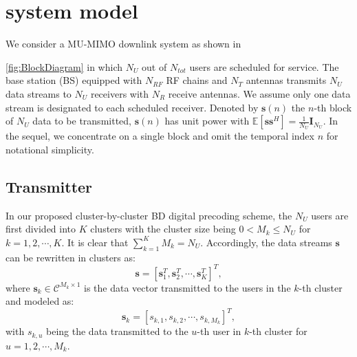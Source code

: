 \documentclass[conference]{IEEEtran}
\begin{document}
\section{system model}
We consider a MU-MIMO downlink system as shown in \figurename{\ref{fig:BlockDiagram} in which $N_U$ out of $N_{tot}$ users are scheduled for service. The base station (BS) equipped with $N_{RF}$ RF chains and $N_T$ antennas transmits $N_U$ data streams to $N_U$ receivers with $N_R$ receive antennas. We assume only one data stream is designated to each scheduled receiver. Denoted by ${\bm s}(n)$ the $n$-th block of $N_U$ data to be transmitted, ${\bm s}(n)$ has unit power with $\mathbb{E}\left[\bm{ss}^H\right]=\frac{1}{N_U}\bm{I}_{N_U}$. In the sequel, we concentrate on a single block and omit the temporal index $n$ for notational simplicity.

\subsection{Transmitter}
In our proposed cluster-by-cluster BD digital precoding scheme, the $N_U$ users are first divided into $K$ clusters with the cluster size being $0< M_k\leq N_U$ for $k=1,2,\cdots,K$. It is clear that $\displaystyle\sum_{k=1}^{K} M_k = N_U$. Accordingly, the data streams $\bm{s}$ can be rewritten in clusters as:
\begin{equation}
\bm{s} = \left[{\mathbf{s}}_1^T, {\mathbf{s}}_2^T,\cdots, \mathbf{s}_{K}^T\right]^T,
\end{equation}
where $\mathbf{s}_k\in \mathcal{C}^{M_k\times 1}$ is the data vector transmitted to the users in the $k$-th cluster and modeled as:
\begin{equation}
\mathbf{s}_k = \left[s_{k,1}, s_{k,2},\cdots, s_{k,M_k}\right]^T,
\end{equation}
with $s_{k,u}$ being the data transmitted to the $u$-th user in $k$-th cluster for $u=1,2,\cdots,M_k$.

}
\end{document}
